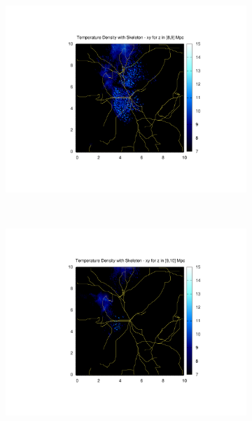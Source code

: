 \documentclass[journal]{IEEEtran}
\begin{document}
\begin{figure}[!t]
\begin{subfigure}[t]{0.3\textwidth}
		\includegraphics[width=\linewidth]{TempDenSkel09}
	\end{subfigure}
	\\
	\begin{subfigure}[t]{0.3\textwidth}
		\centering
		\includegraphics[width=\linewidth]{TempDenSkel10}
	\end{subfigure}
	\quad
	\begin{subfigure}[t]{0.3\textwidth}
		\centering

\end{subfigure}
\end{figure}
\end{document}
